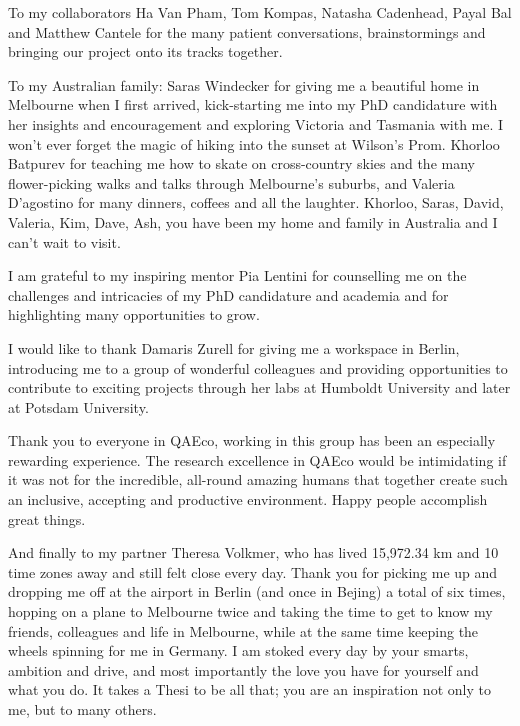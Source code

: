 \documentclass[titlesmallcaps,copyrightpage]{uomthesis}\usepackage[]{graphicx}\usepackage[]{color}
\begin{document}
To my collaborators Ha Van Pham, Tom Kompas, Natasha Cadenhead, Payal Bal and Matthew Cantele for the many patient conversations, brainstormings and bringing our project onto its tracks together.

To my Australian family: Saras Windecker for giving me a beautiful home in Melbourne when I first arrived, kick-starting me into my PhD candidature with her insights and encouragement and exploring Victoria and Tasmania with me. I won't ever forget the magic of hiking into the sunset at Wilson's Prom. Khorloo Batpurev for teaching me how to skate on cross-country skies and the many flower-picking walks and talks through Melbourne's suburbs, and Valeria D'agostino for many dinners, coffees and all the laughter. Khorloo, Saras, David, Valeria, Kim, Dave, Ash, you have been my home and family in Australia and I can't wait to visit.

I am grateful to my inspiring mentor Pia Lentini for counselling me on the challenges and intricacies of my PhD candidature and academia and for highlighting many opportunities to grow.

I would like to thank Damaris Zurell for giving me a workspace in Berlin, introducing me to a group of wonderful colleagues and providing opportunities to contribute to exciting projects through her labs at Humboldt University and later at Potsdam University.

Thank you to everyone in QAEco, working in this group has been an especially rewarding experience. The research excellence in QAEco would be intimidating if it was not for the incredible, all-round amazing humans that together create such an inclusive, accepting and productive environment. Happy people accomplish great things.

And finally to my partner Theresa Volkmer, who has lived 15,972.34 km and 10 time zones away and still felt close every day. Thank you for picking me up and dropping me off at the airport in Berlin (and once in Bejing) a total of six times, hopping on a plane to Melbourne twice and taking the time to get to know my friends, colleagues and life in Melbourne, while at the same time keeping the wheels spinning for me in Germany. I am stoked every day by your smarts, ambition and drive, and most importantly the love you have for yourself and what you do. It takes a Thesi to be all that; you are an inspiration not only to me, but to many others.



\clearpage{\pagestyle{empty}\cleardoublepage}
\end{document}
